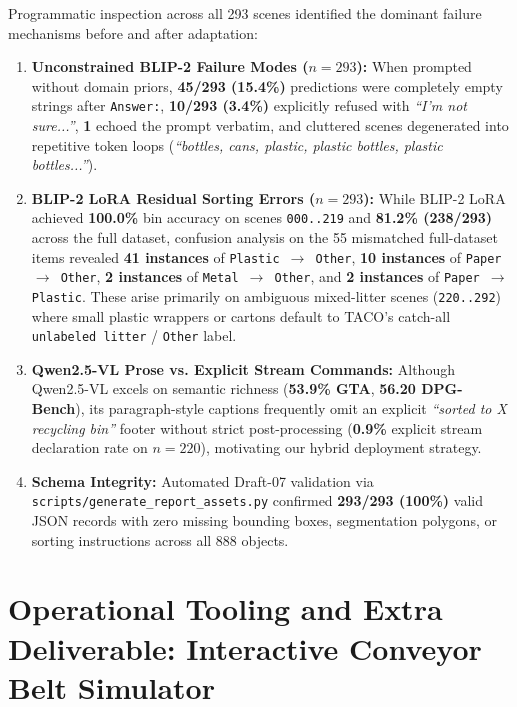 \documentclass[11pt,a4paper]{article}
\begin{document}
Programmatic inspection across all 293 scenes identified the dominant failure mechanisms before and after adaptation:
\begin{enumerate}[leftmargin=1.5em]
    \item \textbf{Unconstrained BLIP-2 Failure Modes ($n=293$):} When prompted without domain priors, \textbf{45/293 (15.4\%)} predictions were completely empty strings after \texttt{Answer:}, \textbf{10/293 (3.4\%)} explicitly refused with \textit{``I'm not sure...''}, \textbf{1} echoed the prompt verbatim, and cluttered scenes degenerated into repetitive token loops (\textit{``bottles, cans, plastic, plastic bottles, plastic bottles...''}).
    \item \textbf{BLIP-2 LoRA Residual Sorting Errors ($n=293$):} While BLIP-2 LoRA achieved \textbf{100.0\%} bin accuracy on scenes \texttt{000..219} and \textbf{81.2\% (238/293)} across the full dataset, confusion analysis on the 55 mismatched full-dataset items revealed \textbf{41 instances} of \texttt{Plastic $\to$ Other}, \textbf{10 instances} of \texttt{Paper $\to$ Other}, \textbf{2 instances} of \texttt{Metal $\to$ Other}, and \textbf{2 instances} of \texttt{Paper $\to$ Plastic}. These arise primarily on ambiguous mixed-litter scenes (\texttt{220..292}) where small plastic wrappers or cartons default to TACO's catch-all \texttt{unlabeled litter} / \texttt{Other} label.
    \item \textbf{Qwen2.5-VL Prose vs. Explicit Stream Commands:} Although Qwen2.5-VL excels on semantic richness (\textbf{53.9\% GTA}, \textbf{56.20 DPG-Bench}), its paragraph-style captions frequently omit an explicit \textit{``sorted to X recycling bin''} footer without strict post-processing (\textbf{0.9\%} explicit stream declaration rate on $n=220$), motivating our hybrid deployment strategy.
    \item \textbf{Schema Integrity:} Automated Draft-07 validation via \texttt{scripts/generate\_report\_assets.py} confirmed \textbf{293/293 (100\%)} valid JSON records with zero missing bounding boxes, segmentation polygons, or sorting instructions across all 888 objects.
\end{enumerate}

\section{Operational Tooling and Extra Deliverable: Interactive Conveyor Belt Simulator}
\end{document}
